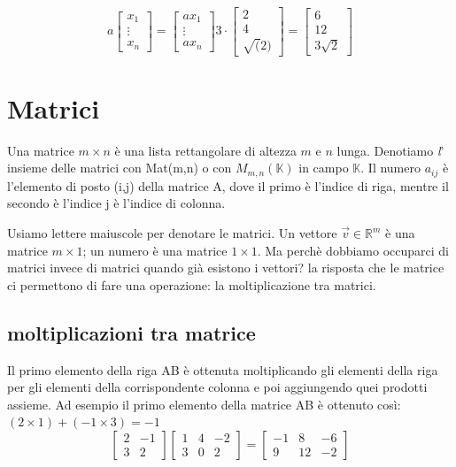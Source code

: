 \documentclass{report}
\begin{document}
    \begin{equation}
      a \begin{bmatrix}
        x_1\\
        \vdots\\
        x_n
      \end{bmatrix} = \begin{bmatrix}
        ax_1\\
        \vdots\\
        ax_n
      \end{bmatrix}
     3 \cdot \begin{bmatrix}
    2\\
    4\\
    \sqrt(2)
  \end{bmatrix} = \begin{bmatrix}
    6\\
    12\\
    3\sqrt{2}
  \end{bmatrix}
\end{equation}
\section{Matrici}
\begin{tcolorbox}
  Una matrice  \( m \times n \) è una lista rettangolare di altezza \(m\) e \(n\) lunga. Denotiamo \textit{l}' insieme delle matrici con Mat(m,n) o con \(M_{m,n}(\mathbb{K})\) in campo \(\mathbb{K}\). Il numero \(a_{ij}\) è l'elemento di posto (i,j) della matrice A, dove il primo è l'indice di riga, mentre il secondo è l'indice j è l'indice di colonna.
\end{tcolorbox}
Usiamo lettere maiuscole per denotare le matrici. Un vettore \(\vec{v} \in \mathbb{R}^m\) è una matrice \(m \times 1\); un numero è una matrice \(1 \times 1\). Ma perchè dobbiamo occuparci di matrici invece di matrici quando già esistono i vettori? la risposta che le matrice ci permettono di fare una operazione: la moltiplicazione tra matrici.
\subsection{moltiplicazioni tra matrice}
Il primo elemento della riga AB è ottenuta moltiplicando gli elementi della riga per gli elementi della corrispondente colonna e poi aggiungendo quei prodotti assieme. Ad esempio il primo elemento della matrice AB è ottenuto così: \((2 \times 1) + (-1 \times 3)= -1\)
\begin{equation}
  \begin{bmatrix}
    2 & -1\\
    3 & 2
  \end{bmatrix} \begin{bmatrix}
    1 & 4 & -2\\
    3 & 0 & 2
  \end{bmatrix} =
  \begin{bmatrix}
    -1 & 8 & -6\\
    9 & 12 & -2
    \end{bmatrix}
  \end{equation}
\end{document}

